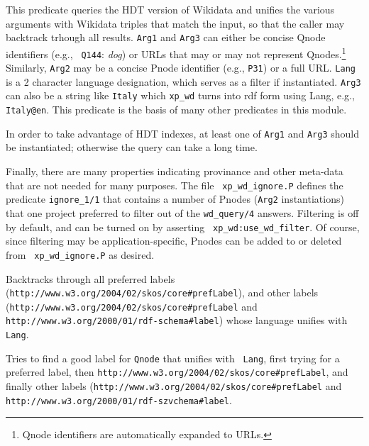 \begin{description}
  This predicate queries the HDT version of Wikidata and unifies the
  various arguments with Wikidata triples that match the input, so
  that the caller may backtrack trhough all results.  {\tt Arg1} and
  {\tt Arg3} can either be concise Qnode identifiers (e.g., {\tt
    Q144}: {\em dog}) or URLs that may or may not represent
  Qnodes.\footnote{Qnode identifiers are automatically expanded to
  URLs.}  Similarly, {\tt Arg2} may be a concise Pnode identifier
  (e.g., {\tt P31}) or a full URL. {\tt Lang} is a 2 character language
  designation, which serves as a filter if instantiated.  {\tt Arg3}
  can also be a string like {\tt Italy} which {\tt xp\_wd} turns into
  rdf form using Lang, e.g., {\tt Italy@en}.  This predicate is the
  basis of many other predicates in this module.

 In order to take advantage of HDT indexes, at least one of {\tt Arg1}
 and {\tt Arg3} should be instantiated; otherwise the query can take a
 long time.

Finally, there are many properties indicating provinance and other
meta-data that are not needed for many purposes.  The file {\tt
  xp\_wd\_ignore.P} defines the predicate {\tt ignore\_1/1} that
contains a number of Pnodes ({\tt Arg2} instantiations) that one
project preferred to filter out of the {\tt wd\_query/4} answers.
Filtering is off by default, and can be turned on by asserting {\tt
  xp\_wd:use\_wd\_filter}.  Of course, since filtering may be
application-specific, Pnodes can be added to or deleted from {\tt
  xp\_wd\_ignore.P} as desired.

Backtracks through all preferred labels
(\verb|http://www.w3.org/2004/02/skos/core#prefLabel|), and other
labels (\verb|http://www.w3.org/2004/02/skos/core#prefLabel| and \\
  \verb|http://www.w3.org/2000/01/rdf-schema#label|) whose language
  unifies with {\tt Lang}.

Tries to find a good label for {\tt Qnode} that unifies with {\tt
  Lang}, first trying for a preferred label, then
\verb|http://www.w3.org/2004/02/skos/core#prefLabel|, and finally
other labels (\verb|http://www.w3.org/2004/02/skos/core#prefLabel| and \\
\verb|http://www.w3.org/2000/01/rdf-szvchema#label|.


\end{description}
